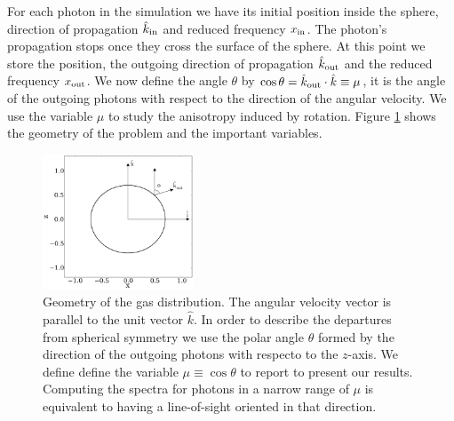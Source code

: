 \documentclass{emulateapj}
\begin{document}
For each photon in the simulation we have its initial position inside
the sphere, direction of propagation $\hat{k}_{\rm in}$ and reduced
frequency $x_{\rm in}$. 
The photon's propagation stops once they cross the
surface of the sphere. At this point we store the position, the outgoing direction
of propagation $\hat{k}_{\rm out}$ and the reduced frequency $x_{\rm
  out}$. We now define the angle $\theta$ by $\cos\theta = \hat{k}_{\rm out}\cdot
\hat{k}\equiv \mu$, it is the angle of the outgoing photons with 
respect to the direction of the angular velocity. We use the variable $\mu$ to
study the anisotropy induced by rotation. Figure \ref{fig:geometry}
shows the geometry of the problem and the important variables.




\begin{figure}
\begin{center}
  \includegraphics[width=0.4\textwidth]{f1.pdf}
\end{center}
\caption{Geometry of the gas distribution. The angular velocity vector
  is parallel to the unit vector $\hat{k}$. In order to describe the
  departures from spherical symmetry we use the polar angle $\theta$
  formed by the direction of the outgoing photons with respecto to the
  $z$-axis. We define define the variable $\mu\equiv\cos\theta$ to
  report to present our results. Computing the spectra for photons in
  a   narrow range of $\mu$ is equivalent to having a line-of-sight
  oriented in that direction.  
    \label{fig:geometry}}  
\end{figure}
\end{document}
